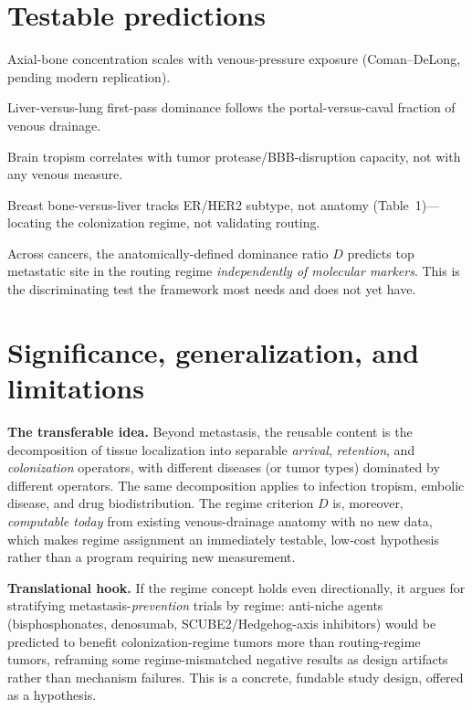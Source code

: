 \documentclass[11pt]{article}
\begin{document}
\section{Testable predictions}

\begin{description}[leftmargin=2.4em,style=nextline,itemsep=0.2em]
  \item[P1.] Axial-bone concentration scales with venous-pressure exposure
  (Coman--DeLong, pending modern replication).
  \item[P2.] Liver-versus-lung first-pass dominance follows the portal-versus-caval
  fraction of venous drainage.
  \item[P3.] Brain tropism correlates with tumor protease/BBB-disruption capacity,
  not with any venous measure.
  \item[P4 (tested; consistency evidence).] Breast bone-versus-liver tracks ER/HER2
  subtype, not anatomy (Table~1)---locating the colonization regime, not
  validating routing.
  \item[P5 (the key untested claim).] Across cancers, the anatomically-defined
  dominance ratio $D$ predicts top metastatic site in the routing regime
  \emph{independently of molecular markers}. This is the discriminating test the
  framework most needs and does not yet have.
\end{description}

\section{Significance, generalization, and limitations}

\textbf{The transferable idea.} Beyond metastasis, the reusable content is the
decomposition of tissue localization into separable \emph{arrival},
\emph{retention}, and \emph{colonization} operators, with different diseases (or
tumor types) dominated by different operators. The same decomposition applies to
infection tropism, embolic disease, and drug biodistribution. The regime criterion
$D$ is, moreover, \emph{computable today} from existing venous-drainage anatomy
with no new data, which makes regime assignment an immediately testable,
low-cost hypothesis rather than a program requiring new measurement.

\textbf{Translational hook.} If the regime concept holds even directionally, it
argues for stratifying metastasis-\emph{prevention} trials by regime: anti-niche
agents (bisphosphonates, denosumab, SCUBE2/Hedgehog-axis inhibitors) would be
predicted to benefit colonization-regime tumors more than routing-regime tumors,
reframing some regime-mismatched negative results as design artifacts rather than
mechanism failures. This is a concrete, fundable study design, offered as a
hypothesis.
\end{document}
